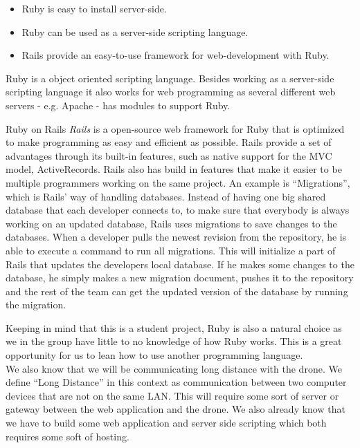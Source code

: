 \begin{itemize}
	\item Ruby is easy to install server-side.
	\item Ruby can be used as a server-side scripting language.
	\item Rails provide an easy-to-use framework for web-development with Ruby.
\end{itemize}

Ruby is a object oriented scripting language.
Besides working as a server-side scripting language it also works for web programming as several different web servers - e.g. Apache - has modules to support Ruby.

Ruby on Rails \emph{Rails} is a open-source web framework for Ruby that is optimized to make programming as easy and efficient as possible.
Rails provide a set of advantages through its built-in features, such as native support for the MVC model, ActiveRecords. 
Rails also has build in features that make it easier to be multiple programmers working on the same project.
An example is ``Migrations'', which is Rails' way of handling databases.
Instead of having one big shared database that each developer connects to, to make sure that everybody is always working on an updated database, Rails uses migrations to save changes to the databases.
When a developer pulls the newest revision from the repository, he is able to execute a command to run all migrations.
This will initialize a part of Rails that updates the developers local database.
If he makes some changes to the database, he simply makes a new migration document, pushes it to the repository and the rest of the team can get the updated version of the database by running the migration.


Keeping in mind that this is a student project, Ruby is also a natural choice as we in the group have little to no knowledge of how Ruby works.
This is a great opportunity for us to lean how to use another programming language. \\

We also know that we will be communicating long distance with the drone.
We define ``Long Distance'' in this context as communication between two computer devices that are not on the same LAN. 
This will require some sort of server or gateway between the web application and the drone.
We also already know that we have to build some web application and server side scripting which both requires some soft of hosting.




